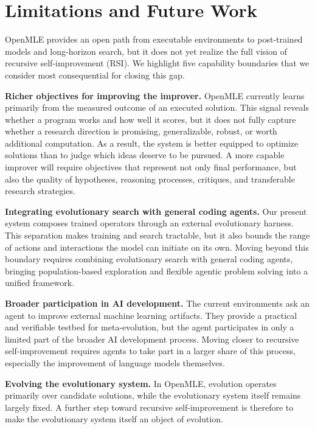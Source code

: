 \section{Limitations and Future Work}
\label{sec:limitations-and-future-work}

OpenMLE provides an open path from executable environments to post-trained models and long-horizon search, but it does not yet realize the full vision of recursive self-improvement (RSI). We highlight five capability boundaries that we consider most consequential for closing this gap.

\textbf{Richer objectives for improving the improver.}
OpenMLE currently learns primarily from the measured outcome of an executed
solution. This signal reveals whether a program works and how well it scores,
but it does not fully capture whether a research direction is promising,
generalizable, robust, or worth additional computation. As a result, the
system is better equipped to optimize solutions than to judge which ideas
deserve to be pursued. A more capable improver will require objectives that
represent not only final performance, but also the quality of hypotheses,
reasoning processes, critiques, and transferable research strategies.

\textbf{Integrating evolutionary search with general coding agents.}
Our present system composes trained operators through an external evolutionary
harness. This separation makes training and search tractable, but it also
bounds the range of actions and interactions the model can initiate on its
own. Moving beyond this boundary requires combining evolutionary search with
general coding agents, bringing population-based exploration and flexible
agentic problem solving into a unified framework.

\textbf{Broader participation in AI development.}
The current environments ask an agent to improve external machine learning
artifacts. They provide a practical and verifiable testbed for meta-evolution,
but the agent participates in only a limited part of the broader AI development
process. Moving closer to recursive self-improvement requires agents to take
part in a larger share of this process, especially the improvement of language
models themselves.

\textbf{Evolving the evolutionary system.}
In OpenMLE, evolution operates primarily over candidate solutions, while the
evolutionary system itself remains largely fixed. A further step toward
recursive self-improvement is therefore to make the evolutionary system itself
an object of evolution.

